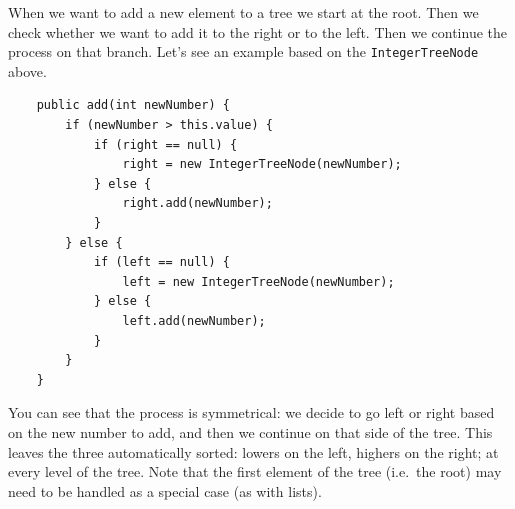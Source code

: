 When we want to add a new element to a tree we start at the root. Then
we check whether we want to add it to the right or to the left. Then
we continue the process on that branch. Let's see an example based on 
the \verb+IntegerTreeNode+ above.

\begin{verbatim}
    public add(int newNumber) {
        if (newNumber > this.value) {
            if (right == null) {
                right = new IntegerTreeNode(newNumber);
            } else {
                right.add(newNumber);
            }
        } else {
            if (left == null) {
                left = new IntegerTreeNode(newNumber);
            } else {
                left.add(newNumber);
            }
        }            
    }
\end{verbatim}

You can see that the process is symmetrical: we decide to go left or
right based on the new number to add, and then we continue on that
side of the tree. This leaves the three automatically sorted: lowers
on the left, highers on the right; at every level of the tree. 
Note that the first element of the tree (i.e.~the
root) may need to be handled as a special case (as with lists).

